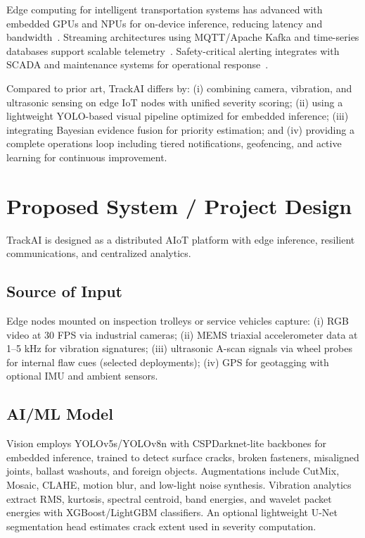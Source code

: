 \documentclass[conference]{IEEEtran}
\begin{document}
Edge computing for intelligent transportation systems has advanced with embedded GPUs and NPUs for on-device inference, reducing latency and bandwidth~\cite{li2018edge}. Streaming architectures using MQTT/Apache Kafka and time-series databases support scalable telemetry~\cite{kreps2015log}. Safety-critical alerting integrates with SCADA and maintenance systems for operational response~\cite{sakr2018scada}.

Compared to prior art, TrackAI differs by: (i) combining camera, vibration, and ultrasonic sensing on edge IoT nodes with unified severity scoring; (ii) using a lightweight YOLO-based visual pipeline optimized for embedded inference; (iii) integrating Bayesian evidence fusion for priority estimation; and (iv) providing a complete operations loop including tiered notifications, geofencing, and active learning for continuous improvement.

\section{Proposed System / Project Design}
\label{sec:design}
TrackAI is designed as a distributed AIoT platform with edge inference, resilient communications, and centralized analytics.

\subsection{Source of Input}
Edge nodes mounted on inspection trolleys or service vehicles capture: (i) RGB video at 30 FPS via industrial cameras; (ii) MEMS triaxial accelerometer data at 1--5 kHz for vibration signatures; (iii) ultrasonic A-scan signals via wheel probes for internal flaw cues (selected deployments); (iv) GPS for geotagging with optional IMU and ambient sensors.

\subsection{AI/ML Model}
Vision employs YOLOv5s/YOLOv8n with CSPDarknet-lite backbones for embedded inference, trained to detect surface cracks, broken fasteners, misaligned joints, ballast washouts, and foreign objects. Augmentations include CutMix, Mosaic, CLAHE, motion blur, and low-light noise synthesis. Vibration analytics extract RMS, kurtosis, spectral centroid, band energies, and wavelet packet energies with XGBoost/LightGBM classifiers. An optional lightweight U-Net segmentation head estimates crack extent used in severity computation.
\end{document}
